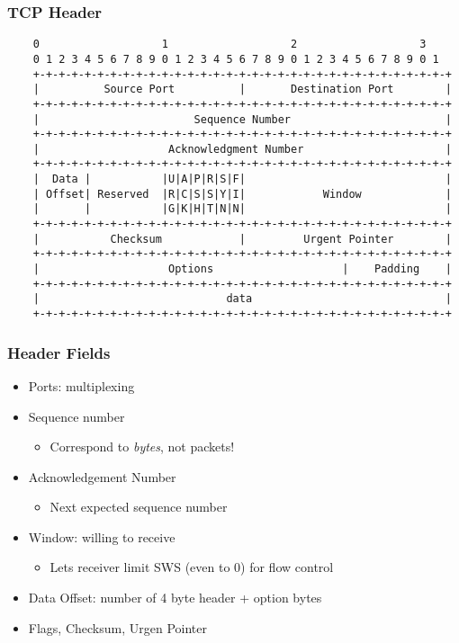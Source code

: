\subsubsection{TCP Header}
\begin{Verbatim}
    0                   1                   2                   3
    0 1 2 3 4 5 6 7 8 9 0 1 2 3 4 5 6 7 8 9 0 1 2 3 4 5 6 7 8 9 0 1
    +-+-+-+-+-+-+-+-+-+-+-+-+-+-+-+-+-+-+-+-+-+-+-+-+-+-+-+-+-+-+-+-+
    |          Source Port          |       Destination Port        |
    +-+-+-+-+-+-+-+-+-+-+-+-+-+-+-+-+-+-+-+-+-+-+-+-+-+-+-+-+-+-+-+-+
    |                        Sequence Number                        |
    +-+-+-+-+-+-+-+-+-+-+-+-+-+-+-+-+-+-+-+-+-+-+-+-+-+-+-+-+-+-+-+-+
    |                    Acknowledgment Number                      |
    +-+-+-+-+-+-+-+-+-+-+-+-+-+-+-+-+-+-+-+-+-+-+-+-+-+-+-+-+-+-+-+-+
    |  Data |           |U|A|P|R|S|F|                               |
    | Offset| Reserved  |R|C|S|S|Y|I|            Window             |
    |       |           |G|K|H|T|N|N|                               |
    +-+-+-+-+-+-+-+-+-+-+-+-+-+-+-+-+-+-+-+-+-+-+-+-+-+-+-+-+-+-+-+-+
    |           Checksum            |         Urgent Pointer        |
    +-+-+-+-+-+-+-+-+-+-+-+-+-+-+-+-+-+-+-+-+-+-+-+-+-+-+-+-+-+-+-+-+
    |                    Options                    |    Padding    |
    +-+-+-+-+-+-+-+-+-+-+-+-+-+-+-+-+-+-+-+-+-+-+-+-+-+-+-+-+-+-+-+-+
    |                             data                              |
    +-+-+-+-+-+-+-+-+-+-+-+-+-+-+-+-+-+-+-+-+-+-+-+-+-+-+-+-+-+-+-+-+
\end{Verbatim}
\subsubsection{Header Fields}
\begin{itemize}[nosep]
    \item Ports: multiplexing
    \item Sequence number
          \begin{itemize}[nosep]
              \item Correspond to \emph{bytes}, not packets!
          \end{itemize}
    \item Acknowledgement Number
          \begin{itemize}[nosep]
              \item Next expected sequence number
          \end{itemize}
    \item Window: willing to receive
          \begin{itemize}[nosep]
              \item Lets receiver limit SWS (even to 0) for flow control
          \end{itemize}
    \item Data Offset: number of 4 byte header + option bytes
    \item Flags, Checksum, Urgen Pointer
\end{itemize}
